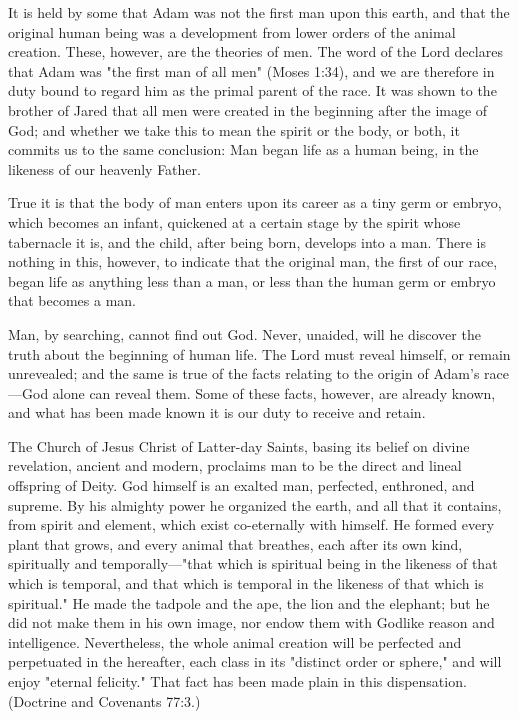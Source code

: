 It is held by some that Adam was not the first man upon this earth, and that the original
human being was a development from lower orders of the animal creation. These, however,
are the theories of men. The word of the Lord declares that Adam was "the first man of all
men" (Moses 1:34), and we are therefore in duty bound to regard him as the primal parent of
the race. It was shown to the brother of Jared that all men were created in the beginning after
the image of God; and whether we take this to mean the spirit or the body, or both, it
commits us to the same conclusion: Man began life as a human being, in the likeness of our
heavenly Father.

True it is that the body of man enters upon its career as a tiny germ or embryo, which
becomes an infant, quickened at a certain stage by the spirit whose tabernacle it is, and the
child, after being born, develops into a man. There is nothing in this, however, to indicate
that the original man, the first of our race, began life as anything less than a man, or less than
the human germ or embryo that becomes a man.

Man, by searching, cannot find out God. Never, unaided, will he discover the truth about the
beginning of human life. The Lord must reveal himself, or remain unrevealed; and the same
is true of the facts relating to the origin of Adam's race—God alone can reveal them. Some of
these facts, however, are already known, and what has been made known it is our duty to
receive and retain.

The Church of Jesus Christ of Latter-day Saints, basing its belief on divine revelation,
ancient and modern, proclaims man to be the direct and lineal offspring of Deity. God
himself is an exalted man, perfected, enthroned, and supreme. By his almighty power he
organized the earth, and all that it contains, from spirit and element, which exist co-eternally
with himself. He formed every plant that grows, and every animal that breathes, each after its
own kind, spiritually and temporally—"that which is spiritual being in the likeness of that
which is temporal, and that which is temporal in the likeness of that which is spiritual." He
made the tadpole and the ape, the lion and the elephant; but he did not make them in his own
image, nor endow them with Godlike reason and intelligence. Nevertheless, the whole animal
creation will be perfected and perpetuated in the hereafter, each class in its "distinct order or
sphere," and will enjoy "eternal felicity." That fact has been made plain in this dispensation.
(Doctrine and Covenants 77:3.)

